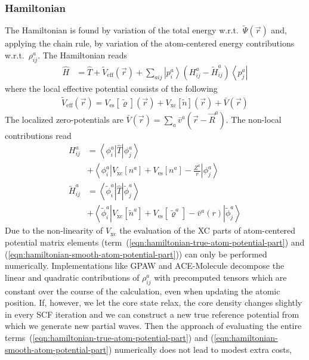 \documentclass[oribibl]{llncs}
\newcommand{\um}[1]{_{\mathrm{#1}}}
\newcommand{\ket}[1]{\left| #1 \right\rangle}
\newcommand{\bra}[1]{\left\langle #1 \right|}
\newcommand{\braketop}[3]{\left\langle \left. #1 \right| #2 \left| #3 \right. \right\rangle}
\begin{document}
\subsubsection{Hamiltonian}
%
The Hamiltonian is found by variation of the total energy w.r.t.~$\tilde \Psi(\vec r)$
and, applying the chain rule, 
by variation of the atom-centered energy contributions w.r.t.~$\rho^a_{ij}$.
%
The Hamiltonian reads
\begin{align}
  \hat H &= \hat T + \tilde V\um{eff}(\vec r) + \sum_{aij} \ket{p^a_i} \left( H^a_{ij} - \tilde H^a_{ij} \right)
  \bra{p^a_j}
\end{align}
where the local effective potential consists of the following
\begin{align}
  \tilde V\um{eff}(\vec r) = V\um{es}[\tilde\varrho](\vec r) + V\um{xc}[\tilde n](\vec r) + \bar V(\vec r)
\end{align}
The localized zero-potentials are $\bar V(\vec r) = \sum_a \bar v^a(\vec r - \vec R^a)$.
The non-local contributions read
\begin{align}
	H^a_{ij} &= \braketop{ \phi^a_i }{ \hat T }{ \phi^a_j } \\
	         &+ \braketop{ \phi^a_i }{ V\um{xc}[n^a] + V\um{es}[n^a] - \frac{Z^a}{r} }{ \phi^a_j } 
	         \label{eqn:hamiltonian-true-atom-potential-part} \\
	\tilde H^a_{ij} &= \braketop{ \tilde\phi^a_i }{ \hat T }{ \tilde\phi^a_j } \\
	         &+ \braketop{ \tilde\phi^a_i }{ V\um{xc}[\tilde n^a] + V\um{es}[\tilde\varrho^a] - \bar v^a(r) }{ \tilde\phi^a_j }
	         \label{eqn:hamiltonian-smooth-atom-potential-part}
\end{align}
Due to the non-linearity of $V\um{xc}$ the evaluation of the \ac{XC} parts of atom-centered potential matrix elements
(term~(\ref{eqn:hamiltonian-true-atom-potential-part}) and (\ref{eqn:hamiltonian-smooth-atom-potential-part}))
can only be performed numerically.
Implementations like GPAW \cite{GPAW,Rostgaard-paw-note} and ACE-Molecule \cite{Kang2016}
decompose the linear and quadratic contributions of $\rho^a_{ij}$ with precomputed tensors
which are constant over the course of the calculation, even when updating the atomic position.
If, however, we let the core state relax, the core density changes slightly in every \ac{SCF} iteration
and we can construct a new true reference potential from which we generate new partial waves.
Then the approach of evaluating the entire terms~(\ref{eqn:hamiltonian-true-atom-potential-part}) and (\ref{eqn:hamiltonian-smooth-atom-potential-part}) numerically does not lead to modest extra costs, 
\end{document}
